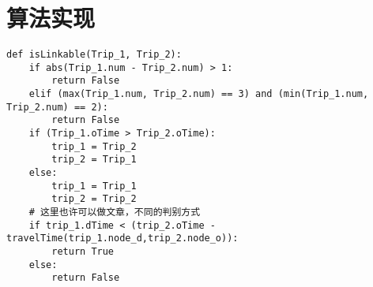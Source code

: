 \chapter{算法实现}
\begin{lstlisting}
def isLinkable(Trip_1, Trip_2):
    if abs(Trip_1.num - Trip_2.num) > 1:
        return False
    elif (max(Trip_1.num, Trip_2.num) == 3) and (min(Trip_1.num, Trip_2.num) == 2):
        return False
    if (Trip_1.oTime > Trip_2.oTime):
        trip_1 = Trip_2
        trip_2 = Trip_1
    else:
        trip_1 = Trip_1
        trip_2 = Trip_2
    # 这里也许可以做文章，不同的判别方式
    if trip_1.dTime < (trip_2.oTime - travelTime(trip_1.node_d,trip_2.node_o)):
        return True
    else:
        return False
\end{lstlisting}
